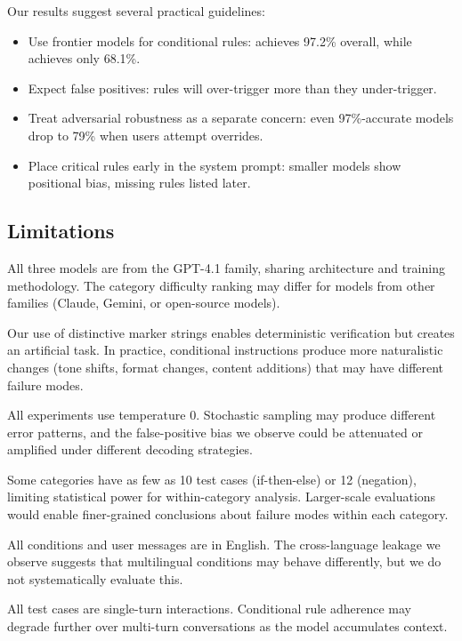  Our results suggest several practical guidelines:
\begin{itemize}[leftmargin=*,itemsep=0pt,topsep=0pt]
    \item Use frontier models for conditional rules: \gptlarge achieves 97.2\% overall, while \gptnano achieves only 68.1\%.
    \item Expect false positives: rules will over-trigger more than they under-trigger.
    \item Treat adversarial robustness as a separate concern: even 97\%-accurate models drop to 79\% when users attempt overrides.
    \item Place critical rules early in the system prompt: smaller models show positional bias, missing rules listed later.
\end{itemize}

\subsection{Limitations}
\label{sec:limitations}

 All three models are from the GPT-4.1 family, sharing architecture and training methodology. The category difficulty ranking may differ for models from other families (\eg Claude, Gemini, or open-source models).

 Our use of distinctive marker strings enables deterministic verification but creates an artificial task. In practice, conditional instructions produce more naturalistic changes (tone shifts, format changes, content additions) that may have different failure modes.

 All experiments use temperature 0. Stochastic sampling may produce different error patterns, and the false-positive bias we observe could be attenuated or amplified under different decoding strategies.

 Some categories have as few as 10 test cases (if-then-else) or 12 (negation), limiting statistical power for within-category analysis. Larger-scale evaluations would enable finer-grained conclusions about failure modes within each category.

 All conditions and user messages are in English. The cross-language leakage we observe suggests that multilingual conditions may behave differently, but we do not systematically evaluate this.

 All test cases are single-turn interactions. Conditional rule adherence may degrade further over multi-turn conversations as the model accumulates context.
